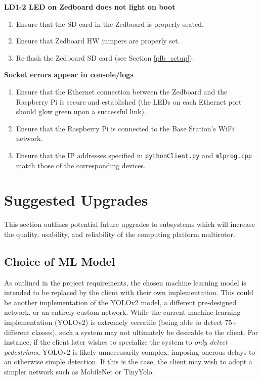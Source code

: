 \documentclass[10pt,letterpaper]{article}
\begin{document}
\textbf{LD1-2 LED on Zedboard does not light on boot}
\begin{enumerate}
\item Ensure that the SD card in the Zedboard is properly seated.
\item Ensure that Zedboard HW jumpers are properly set.
\item Re-flash the Zedboard SD card (see Section \ref{plb_setup}).
\end{enumerate}

\textbf{Socket errors appear in console/logs}
\begin{enumerate}
\item Ensure that the Ethernet connection between the Zedboard and the Raspberry Pi is secure and established (the LEDs on each Ethernet port should glow green upon a successful link).
\item Ensure that the Raspberry Pi is connected to the Base Station's WiFi network.
\item Ensure that the IP addresses specified in \texttt{pythonClient.py} and \texttt{mlprog.cpp} match those of the corresponding devices.
\end{enumerate}

\clearpage
\section{Suggested Upgrades}
This section outlines potential future upgrades to subsystems which will increase the quality, usability, and reliability of the computing platform multirotor. 

\subsection{Choice of ML Model}
As outlined in the project requirements, the chosen machine learning model is intended to be replaced by the client with their own implementation. This could be another implementation of the YOLOv2 model, a different pre-designed network, or an entirely custom network. While the current machine learning implementation (YOLOv2) is extremely versatile (being able to detect 75+ different classes), such a system may not ultimately be desirable to the client. For instance, if the client later wishes to specialize the system to \textit{only detect pedestrians}, YOLOv2 is likely unnecessarily complex, imposing onerous delays to an otherwise simple detection. If this is the case, the client may wish to adopt a simpler network such as MobileNet or TinyYolo.
\end{document}
